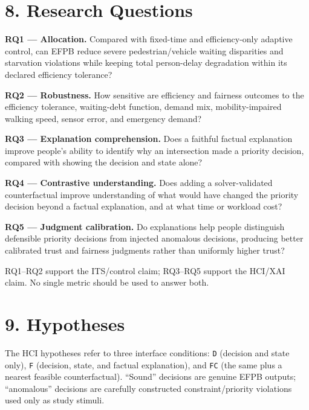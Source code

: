 \documentclass[
  english,
  11pt,
  a4paper,
]{article}
\begin{document}
\section{8. Research Questions}\label{research-questions}

\textbf{RQ1 --- Allocation.} Compared with fixed-time and
efficiency-only adaptive control, can EFPB reduce severe
pedestrian/vehicle waiting disparities and starvation violations while
keeping total person-delay degradation within its declared efficiency
tolerance?

\textbf{RQ2 --- Robustness.} How sensitive are efficiency and fairness
outcomes to the efficiency tolerance, waiting-debt function, demand mix,
mobility-impaired walking speed, sensor error, and emergency demand?

\textbf{RQ3 --- Explanation comprehension.} Does a faithful factual
explanation improve people's ability to identify why an intersection
made a priority decision, compared with showing the decision and state
alone?

\textbf{RQ4 --- Contrastive understanding.} Does adding a
solver-validated counterfactual improve understanding of what would have
changed the priority decision beyond a factual explanation, and at what
time or workload cost?

\textbf{RQ5 --- Judgment calibration.} Do explanations help people
distinguish defensible priority decisions from injected anomalous
decisions, producing better calibrated trust and fairness judgments
rather than uniformly higher trust?

RQ1--RQ2 support the ITS/control claim; RQ3--RQ5 support the HCI/XAI
claim. No single metric should be used to answer both.

\section{9. Hypotheses}\label{hypotheses}

The HCI hypotheses refer to three interface conditions: \texttt{D}
(decision and state only), \texttt{F} (decision, state, and factual
explanation), and \texttt{FC} (the same plus a nearest feasible
counterfactual). ``Sound'' decisions are genuine EFPB outputs;
``anomalous'' decisions are carefully constructed constraint/priority
violations used only as study stimuli.
\end{document}

